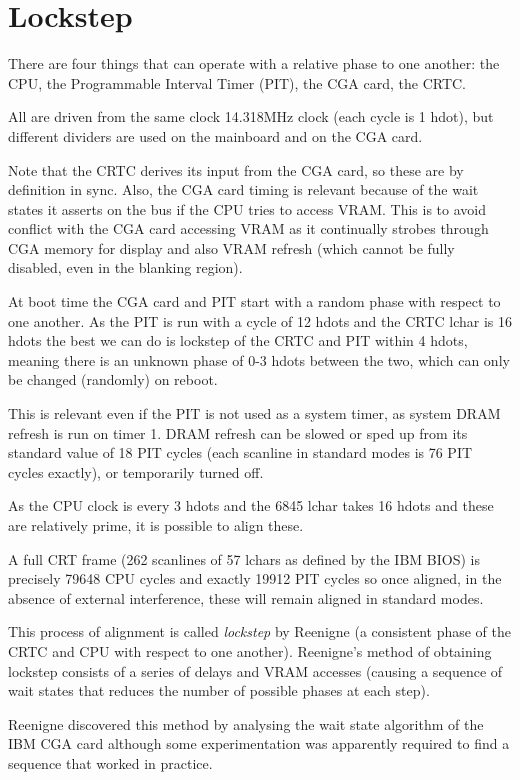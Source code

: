 \documentclass[a4paper,10pt]{amsart}
\begin{document}
\section{Lockstep}

There are four things that can operate with a relative phase to one another:
the CPU, the Programmable Interval Timer (PIT), the CGA card, the CRTC.

All are driven from the same clock 14.318MHz clock (each cycle is 1 hdot), but
different dividers are used on the mainboard and on the CGA card.

Note that the CRTC derives its input from the CGA card, so these are by
definition in sync. Also, the CGA card timing is relevant because of the wait
states it asserts on the bus if the CPU tries to access VRAM. This is to avoid
conflict with the CGA card accessing VRAM as it continually strobes through CGA
memory for display and also VRAM refresh (which cannot be fully disabled, even
in the blanking region).

At boot time the CGA card and PIT start with a random phase with respect to
one another. As the PIT is run with a cycle of 12 hdots and the CRTC lchar is
16 hdots the best we can do is lockstep of the CRTC and PIT within 4 hdots,
meaning there is an unknown phase of 0-3 hdots between the two, which can only
be changed (randomly) on reboot.

This is relevant even if the PIT is not used as a system timer, as system DRAM
refresh is run on timer 1. DRAM refresh can be slowed or sped up from its
standard value of 18 PIT cycles (each scanline in standard modes is 76 PIT
cycles exactly), or temporarily turned off.

As the CPU clock is every 3 hdots and the 6845 lchar takes 16 hdots and these
are relatively prime, it is possible to align these.

A full CRT frame (262 scanlines of 57 lchars as defined by the IBM BIOS) is
precisely 79648 CPU cycles and exactly 19912 PIT cycles so once aligned, in
the absence of external interference, these will remain aligned in standard
modes.

This process of alignment is called \emph{lockstep} by Reenigne (a consistent
phase of the CRTC and CPU with respect to one another). Reenigne's method
of obtaining lockstep consists of a series of delays and VRAM accesses (causing
a sequence of wait states that reduces the number of possible phases at each
step).

Reenigne discovered this method by analysing the wait state algorithm of the
IBM CGA card although some experimentation was apparently required to find a
sequence that worked in practice.
\end{document}
